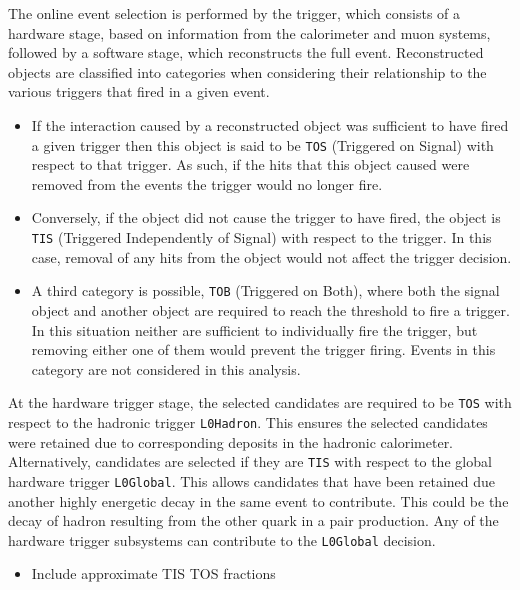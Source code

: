The online event selection is performed by the \lhcb trigger, which consists of a hardware stage, based on information from the calorimeter and muon
systems, followed by a software stage, which reconstructs the full event.
Reconstructed objects are classified into categories when considering their relationship to the various triggers that fired in a given event. 
\begin{itemize}
\item If the interaction caused by a reconstructed object was sufficient to have fired a given trigger then this object is said to be \texttt{TOS} (Triggered on Signal) with respect to that trigger. As such, if the hits that this object caused were removed from the events the trigger would no longer fire. 
\item Conversely, if the object did not cause the trigger to have fired, the object is \texttt{TIS} (Triggered Independently of Signal) with respect to the trigger. In this case, removal of any hits from the object would not affect the trigger decision. 
\item A third category is possible, \texttt{TOB} (Triggered on Both), where both the signal object and another object are required to reach the threshold to fire a trigger. In this situation neither are sufficient to individually fire the trigger, but removing either one of them would prevent the trigger firing. Events in this category are not considered in this analysis.
\end{itemize}

At the hardware trigger stage, the selected candidates are required to be \texttt{TOS} with respect to the hadronic trigger \texttt{L0Hadron}. This ensures the selected candidates were retained due to corresponding deposits in the hadronic calorimeter. Alternatively, candidates are selected if they are \texttt{TIS} with respect to the global hardware trigger \texttt{L0Global}. This allows candidates that have been retained due another highly energetic decay in the same event to contribute. This could be the decay of hadron resulting from the other \bquark quark in a \bquark\bquarkbar pair production. Any of the hardware trigger subsystems can contribute to the \texttt{L0Global} decision.

{\color{Red}
\begin{itemize}
\item Include approximate TIS TOS fractions
\end{itemize}
}


